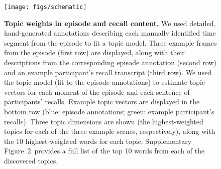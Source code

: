 \documentclass[10pt]{article}
\newcommand{\topics}{2}
\begin{document}
\begin{figure}[tp]
\centering
\texttt{[image: figs/schematic]}
\caption{\small \textbf{Topic weights in episode and recall content.} We used detailed, hand-generated annotations describing each manually identified time segment from the episode to fit a topic model.  Three example frames from the episode (first row) are displayed, along with their descriptions from the corresponding episode annotation (second row) and an example participant's recall transcript (third row).  We used the topic model (fit to the episode annotations) to estimate topic vectors for each moment of the episode and each sentence of participants' recalls.  Example topic vectors are displayed in the bottom row (blue: episode annotations; green: example participant's recalls).  Three topic dimensions are shown (the highest-weighted topics for each of the three example scenes, respectively), along with the 10 highest-weighted words for each topic.  Supplementary Figure~\topics~provides a full list of the top 10 words from each of the discovered topics.}
\label{fig:schematic}
\end{figure}
\end{document}
